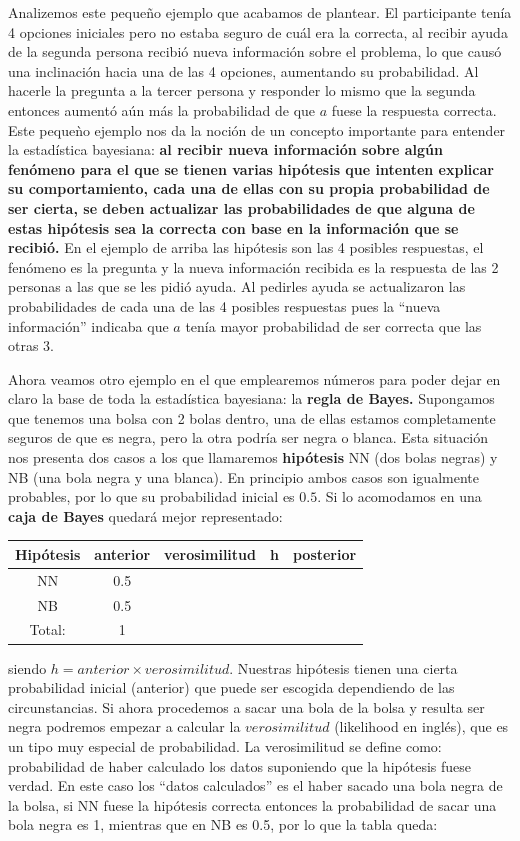 \documentclass{article}
\begin{document}
Analizemos este peque\~no ejemplo que acabamos de plantear. El participante ten\'ia 4 opciones iniciales pero no estaba seguro de cu\'al era la correcta, al recibir ayuda de la segunda persona recibi\'o nueva informaci\'on sobre el problema, lo que caus\'o una inclinaci\'on hacia una de las 4 opciones, aumentando su probabilidad. Al hacerle la pregunta a la tercer persona y responder lo mismo que la segunda entonces aument\'o a\'un m\'as la probabilidad de que $a$ fuese la respuesta correcta. Este peque\`no ejemplo nos da la noci\'on de un concepto importante para entender la estad\'istica bayesiana: \textbf{al recibir nueva informaci\'on sobre alg\'un fen\'omeno para el que se tienen varias hip\'otesis que intenten explicar su comportamiento, cada una de ellas con su propia probabilidad de ser cierta, se deben actualizar las probabilidades de que alguna de estas hip\'otesis sea la correcta con base en la informaci\'on que se recibi\'o.} En el ejemplo de arriba las hip\'otesis son las 4 posibles respuestas, el fen\'omeno es la pregunta y la nueva informaci\'on recibida es la respuesta de las 2 personas a las que se les pidi\'o ayuda. Al pedirles ayuda se actualizaron las probabilidades de cada una de las 4 posibles respuestas pues la ``nueva informaci\'on'' indicaba que $a$ ten\'ia mayor probabilidad de ser correcta que las otras 3. 

Ahora veamos otro ejemplo en el que emplearemos n\'umeros para poder dejar en claro la base de toda la estad\'istica bayesiana: la \textbf{regla de Bayes.} Supongamos que tenemos una bolsa con 2 bolas dentro, una de ellas estamos completamente seguros de que es negra, pero la otra podr\'ia ser negra o blanca. Esta situaci\'on nos presenta dos casos a los que llamaremos \textbf{hip\'otesis} NN (dos bolas negras) y NB (una bola negra y una blanca). En principio ambos casos son igualmente probables, por lo que su probabilidad inicial es $0.5$. Si lo acomodamos en una \textbf{caja de Bayes} quedar\'a mejor representado:

\begin{center}
\begin{tabular}{ |c|c|c|c|c| } 
\hline
Hip\'otesis & anterior & verosimilitud &  h  & posterior \\
\hline
NN & 0.5 & \quad &  & \\
NB & 0.5 &  &  & \\
\hline
Total: & 1 &  &  & \\
\hline
\end{tabular}
\end{center}
siendo $h=anterior \times verosimilitud$. Nuestras hip\'otesis tienen una cierta probabilidad inicial (anterior) que puede ser escogida dependiendo de las circunstancias. Si ahora procedemos a sacar una bola de la bolsa y resulta ser negra podremos empezar a calcular la $verosimilitud$ (likelihood en ingl\'es), que es un tipo muy especial de probabilidad. La verosimilitud se define como: probabilidad de haber calculado los datos suponiendo que la hip\'otesis fuese verdad. En este caso los ``datos calculados'' es el haber sacado una bola negra de la bolsa, si NN fuese la hip\'otesis correcta entonces la probabilidad de sacar una bola negra es 1, mientras que en NB es 0.5, por lo que la tabla queda:
\end{document}
